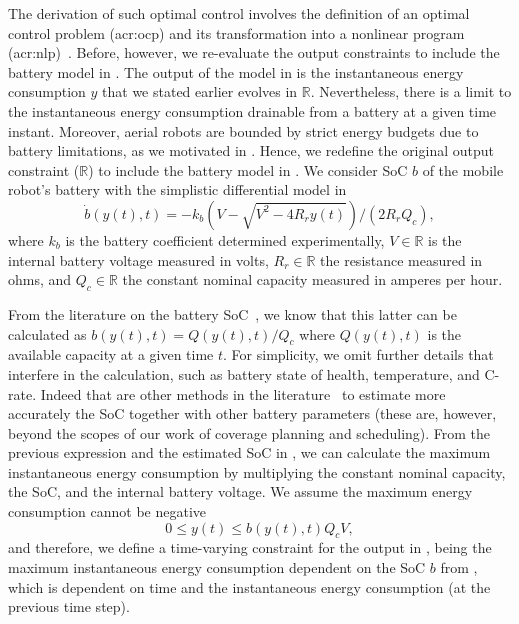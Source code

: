 The derivation of such optimal control involves the definition of an optimal control problem (\Gls{acr:ocp}) and its transformation into a nonlinear program (\Gls{acr:nlp})~\citep{rawlings2017model,grune2017nonlinear}. Before, however, we re-evaluate the output constraints to include the battery model in . 
The output of the model in  is the instantaneous energy consumption $y$ that we stated earlier evolves in $\mathbb{R}$. Nevertheless, there is a limit to the instantaneous energy consumption drainable from a battery at a given time instant. Moreover, aerial robots are bounded by strict energy budgets due to battery limitations, as we motivated in . Hence, we redefine the original output constraint ($\mathbb{R}$) to include the battery model in . We consider SoC $b$ of the mobile robot's battery with the simplistic differential model in 
\begin{equation}\label{eq:bat}
  \dot{b}(y(t),t)=-k_b\left(V-
  \sqrt{
    V^2-
    4R_ry(t)}
  \right)/(2R_rQ_c),
\end{equation}
where $k_b$ is the battery coefficient determined experimentally,  $V\in\mathbb{R}$ is the internal battery voltage measured in volts, $R_r\in\mathbb{R}$ the resistance measured in ohms, and $Q_c\in\mathbb{R}$ the constant nominal capacity measured in amperes per hour. 

From the literature on the battery SoC~\citep{sunden2019thermal,kurzweil2018state,kurzweil2021state,deng2017maximum}, we know that this latter can be calculated as $b(y(t),t)=Q(y(t),t)/Q_c$ where $Q(y(t),t)$ is the available capacity at a given time $t$. For simplicity, we omit further details that interfere in the calculation, such as battery state of health, temperature, and C-rate. Indeed that are other methods in the literature~\citep{lu2013review,zhang2018state,espedal2021current} to estimate more accurately the SoC together with other battery parameters (these are, however, beyond the scopes of our work of coverage planning and scheduling). From the previous expression and the estimated SoC in , we can calculate the maximum instantaneous energy consumption by multiplying the constant nominal capacity, the SoC, and the internal battery voltage. We assume the maximum energy consumption cannot be negative
\begin{equation}
  0\leq y(t)\leq b(y(t),t)Q_cV,
\end{equation}
and therefore, we define a time-varying constraint for the output in , being the maximum instantaneous energy consumption dependent on the SoC $b$ from , which is dependent on time and the instantaneous energy consumption (at the previous time step).

